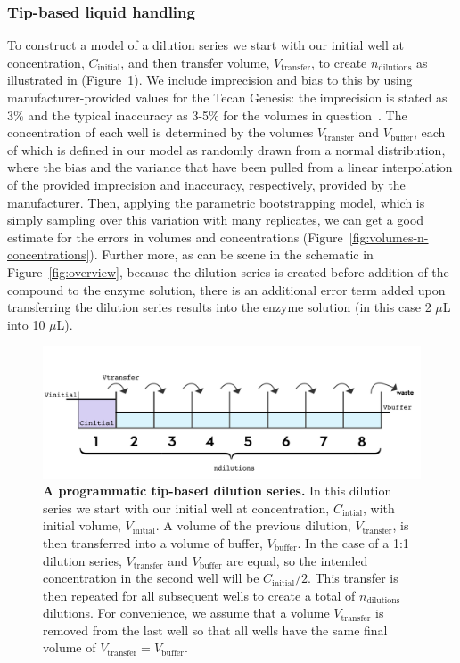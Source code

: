 \documentclass[aps,pre,twocolumn,nofootinbib,superscriptaddress,linenumbers]{revtex4-1}
\begin{document}
\subsubsection*{Tip-based liquid handling}

To construct a model of a dilution series we start with our initial well at concentration, $C_\mathrm{initial}$, and then transfer volume, $V_\mathrm{transfer}$, to create $n_\mathrm{dilutions}$ as illustrated in (Figure~\ref{fig:dilution}). 
We include imprecision and bias to this by using manufacturer-provided values for the Tecan Genesis: the imprecision is stated as 3\% and the typical inaccuracy as 3-5\% for the volumes in question~\cite{_tecan_2001}. 
The concentration of each well is determined by the volumes $V_\mathrm{transfer}$ and $V_\mathrm{buffer}$, each of which is defined in our model as randomly drawn from a normal distribution, where the bias and the variance that have been pulled from a linear interpolation of the provided imprecision and inaccuracy, respectively, provided by the manufacturer.
Then, applying the parametric bootstrapping model, which is simply sampling over this variation with many replicates, we can get a good estimate for the errors in volumes and concentrations (Figure~\ref{fig:volumes-n-concentrations}).
Further more, as can be scene in the schematic in Figure~\ref{fig:overview}, because the dilution series is created before addition of the compound to the enzyme solution, there is an additional error term added upon transferring the dilution series results into the enzyme solution (in this case 2 $\mu$L into 10 $\mu$L).

\begin{figure}[tb]
    \includegraphics[width=\columnwidth]{../figures/dilution.pdf}

  \caption{{\bf A programmatic tip-based dilution series.}
  In this dilution series we start with our initial well at concentration, $C_\mathrm{intial}$, with initial volume, $V_\mathrm{initial}$. 
  A volume of the previous dilution, $V_\mathrm{transfer}$, is then transferred into a volume of buffer, $V_\mathrm{buffer}$. 
  In the case of a 1:1 dilution series, $V_\mathrm{transfer}$ and $V_\mathrm{buffer}$ are equal, so the intended concentration in the second well will be $C_\mathrm{initial}/2$. 
  This transfer is then repeated for all subsequent wells to create a total of $n_\mathrm{dilutions}$ dilutions. 
  For convenience, we assume that a volume $V_\mathrm{transfer}$ is removed from the last well so that all wells have the same final volume of $V_\mathrm{transfer} = V_\mathrm{buffer}$.
  }
  \label{fig:dilution}
\end{figure}
\end{document}
